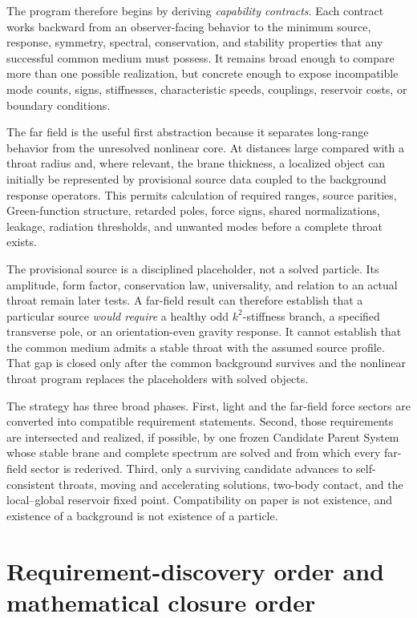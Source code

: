 The program therefore begins by deriving \emph{capability contracts}. Each
contract works backward from an observer-facing behavior to the minimum source,
response, symmetry, spectral, conservation, and stability properties that any
successful common medium must possess. It remains broad enough to compare more
than one possible realization, but concrete enough to expose incompatible mode
counts, signs, stiffnesses, characteristic speeds, couplings, reservoir costs,
or boundary conditions.

The far field is the useful first abstraction because it separates long-range
behavior from the unresolved nonlinear core. At distances large compared with
a throat radius and, where relevant, the brane thickness, a localized object can
initially be represented by provisional source data coupled to the background
response operators. This permits calculation of required ranges, source
parities, Green-function structure, retarded poles, force signs, shared
normalizations, leakage, radiation thresholds, and unwanted modes before a
complete throat exists.

The provisional source is a disciplined placeholder, not a solved particle. Its
amplitude, form factor, conservation law, universality, and relation to an actual
throat remain later tests. A far-field result can therefore establish that a
particular source \emph{would require} a healthy odd \(k^2\)-stiffness branch, a
specified transverse pole, or an orientation-even gravity response. It cannot
establish that the common medium admits a stable throat with the assumed source
profile. That gap is closed only after the common background survives and the
nonlinear throat program replaces the placeholders with solved objects.

The strategy has three broad phases. First, light and the far-field force
sectors are converted into compatible requirement statements. Second, those
requirements are intersected and realized, if possible, by one frozen Candidate
Parent System whose stable brane and complete spectrum are solved and from which
every far-field sector is rederived. Third, only a surviving candidate advances
to self-consistent throats, moving and accelerating solutions, two-body contact,
and the local--global reservoir fixed point. Compatibility on paper is not
existence, and existence of a background is not existence of a particle.

\section{Requirement-discovery order and mathematical closure order}

